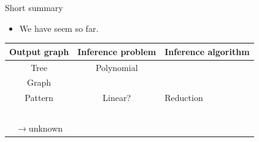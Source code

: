 \documentclass[first=dgreen,second=purple,logo=red]{aaltoslides}
\begin{document}
\begin{frame}{Short summary}
	\begin{itemize}\footnotesize
		\item We have seem so far.		
	\end{itemize}
		\begin{tabular}{|c|c|p{5.5cm}|}
			\hline
			\footnotesize
			 Output graph & Inference problem & Inference algorithm \\ \hline
			 Tree & Polynomial & \dpg\ \cite{Rousu07}  \\
			 Graph & \nphard & \lbp\ \cite{su10structured}  \\ 
			 Pattern & Linear? & Reduction \cite{su2015transporter} \\ \hline
			 \daggraph & \nphard & \sdp\ \cite{su14structured} \\ 
			 $\rightarrow${unknown} & \nphard & \mve\ \amm\ \mam\ \cite{su15multilabel} \rta\ \cite{su14multilabelnips} \\ \hline
		\end{tabular}
\end{frame}
\end{document}
